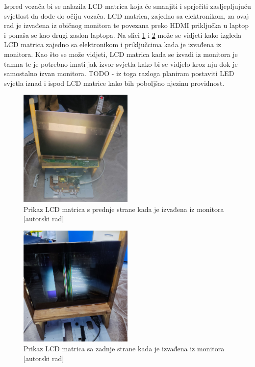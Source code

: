 \documentclass{foi}
\begin{document}
Ispred vozača bi se nalazila LCD matrica koja će smanjiti i sprječiti zasljepljujuću svjetlost da dođe do očiju vozača. LCD matrica, zajedno sa elektronikom, za ovaj rad je izvađena iz običnog monitora te povezana preko HDMI priključka u laptop i ponaša se kao drugi zaslon laptopa. Na slici \ref{fig:lcd_matrica_1} i \ref{fig:lcd_matrica_2} može se vidjeti kako izgleda LCD matrica zajedno sa elektronikom i priključcima kada je izvađena iz monitora. Kao što se može vidjeti, LCD matrica kada se izvadi iz monitora je tamna te je potrebno imati jak izvor svjetla kako bi se vidjelo kroz nju dok je samostalno izvan monitora. TODO - iz toga razloga planiram postaviti LED svjetla iznad i ispod LCD matrice kako bih poboljšao njezinu providnost.

\begin{figure}[h!]
    \centering
    \includegraphics[width=0.5\textwidth]{slike/lcd_matrica_1}
    \caption{Prikaz LCD matrica s prednje strane kada je izvađena iz monitora [autorski rad]}
    \label{fig:lcd_matrica_1}
\end{figure}

\begin{figure}[h!]
    \centering
    \includegraphics[width=0.5\textwidth]{slike/lcd_matrica_2}
    \caption{Prikaz LCD matrica sa zadnje strane kada je izvađena iz monitora [autorski rad]}
    \label{fig:lcd_matrica_2}
\end{figure}
\end{document}
